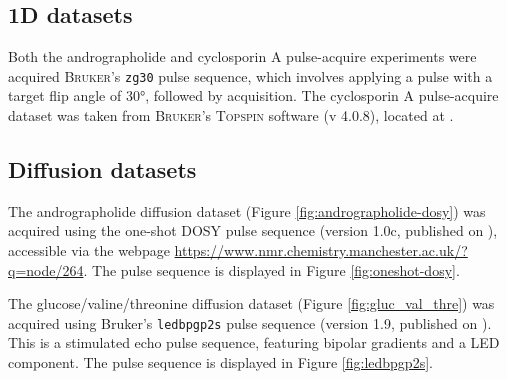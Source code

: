 \subsection{\acs{1D} datasets}
Both the andrographolide and cyclosporin A pulse-acquire experiments were
acquired \textsc{Bruker}'s \texttt{zg30} pulse sequence, which involves
applying a pulse with a target flip angle of \ang{30}, followed by acquisition.
The cyclosporin A pulse-acquire dataset was taken from \textsc{Bruker}'s
\textsc{Topspin} software (v 4.0.8), located at
.



\subsection{Diffusion datasets}
The andrographolide diffusion dataset (Figure \ref{fig:andrographolide-dosy})
was acquired using the one-shot \ac{DOSY} pulse sequence\cite{Pelta2002}
(version 1.0c, published on ), accessible via the webpage
\url{https://www.nmr.chemistry.manchester.ac.uk/?q=node/264}. The pulse
sequence is displayed in Figure \ref{fig:oneshot-dosy}.



The glucose/valine/threonine diffusion dataset (Figure \ref{fig:gluc_val_thre})
was acquired using Bruker's \texttt{ledbpgp2s} pulse sequence (version 1.9, published on
). This is a stimulated echo pulse sequence, featuring
bipolar gradients and a \ac{LED} component\cite{Wu1995}. The pulse sequence is
displayed in Figure \ref{fig:ledbpgp2s}.


